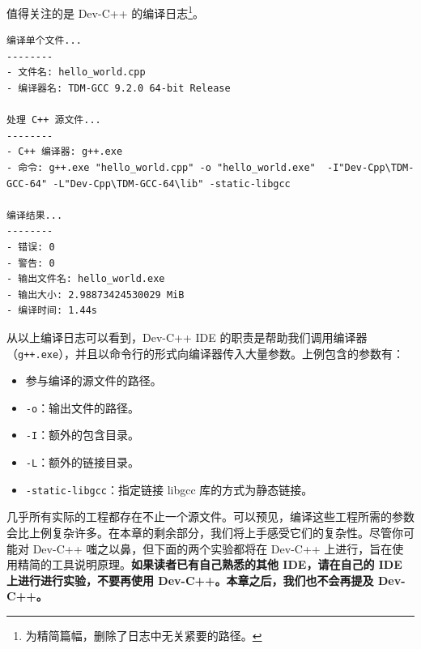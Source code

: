值得关注的是 Dev-C++ 的编译日志\footnote{为精简篇幅，删除了日志中无关紧要的路径。}。

\begin{lstlisting}[language={}]
编译单个文件...
--------
- 文件名: hello_world.cpp
- 编译器名: TDM-GCC 9.2.0 64-bit Release

处理 C++ 源文件...
--------
- C++ 编译器: g++.exe
- 命令: g++.exe "hello_world.cpp" -o "hello_world.exe"  -I"Dev-Cpp\TDM-GCC-64" -L"Dev-Cpp\TDM-GCC-64\lib" -static-libgcc

编译结果...
--------
- 错误: 0
- 警告: 0
- 输出文件名: hello_world.exe
- 输出大小: 2.98873424530029 MiB
- 编译时间: 1.44s
\end{lstlisting}

从以上编译日志可以看到，Dev-C++ IDE 的职责是帮助我们调用编译器（\lstinline[language={}]{g++.exe}），并且以命令行的形式向编译器传入大量参数。上例包含的参数有：

\begin{itemize}
	\item 参与编译的源文件的路径。
	\item \lstinline[language={}]{-o}：输出文件的路径。
	\item \lstinline[language={}]{-I}：额外的包含目录。
	\item \lstinline[language={}]{-L}：额外的链接目录。
	\item \lstinline[language={}]{-static-libgcc}：指定链接 libgcc 库的方式为静态链接。
\end{itemize}

几乎所有实际的工程都存在不止一个源文件。可以预见，编译这些工程所需的参数会比上例复杂许多。在本章的剩余部分，我们将上手感受它们的复杂性。尽管你可能对 Dev-C++ 嗤之以鼻，但下面的两个实验都将在 Dev-C++ 上进行，旨在使用精简的工具说明原理。\textbf{如果读者已有自己熟悉的其他 IDE，请在自己的 IDE 上进行进行实验，不要再使用 Dev-C++。本章之后，我们也不会再提及 Dev-C++。}
